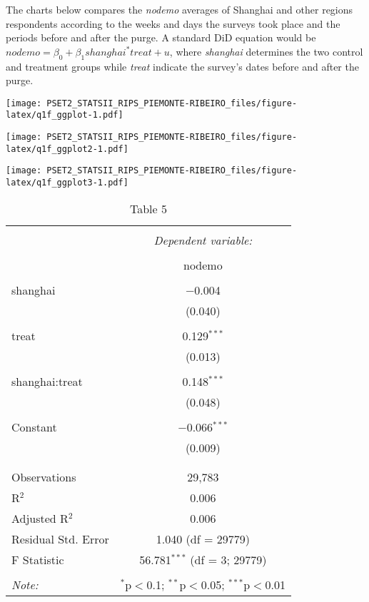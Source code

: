 \documentclass[
]{article}
\begin{document}
The charts below compares the \emph{nodemo} averages of Shanghai and
other regions respondents according to the weeks and days the surveys
took place and the periods before and after the purge. A standard DiD
equation would be \(nodemo = \beta_0 +\beta_1shanghai^*treat +u\), where
\emph{shanghai} determines the two control and treatment groups while
\emph{treat} indicate the survey's dates before and after the purge.

\texttt{[image: PSET2\_STATSII\_RIPS\_PIEMONTE-RIBEIRO\_files/figure-latex/q1f\_ggplot-1.pdf]}

\texttt{[image: PSET2\_STATSII\_RIPS\_PIEMONTE-RIBEIRO\_files/figure-latex/q1f\_ggplot2-1.pdf]}

\texttt{[image: PSET2\_STATSII\_RIPS\_PIEMONTE-RIBEIRO\_files/figure-latex/q1f\_ggplot3-1.pdf]}

\begin{table}[!htbp] \centering 
  \caption{Table 5} 
  \label{} 
\begin{tabular}{@{\extracolsep{5pt}}lc} 
\\[-1.8ex]\hline 
\hline \\[-1.8ex] 
 & \multicolumn{1}{c}{\textit{Dependent variable:}} \\ 
\cline{2-2} 
\\[-1.8ex] & nodemo \\ 
\hline \\[-1.8ex] 
 shanghai & $-$0.004 \\ 
  & (0.040) \\ 
  & \\ 
 treat & 0.129$^{***}$ \\ 
  & (0.013) \\ 
  & \\ 
 shanghai:treat & 0.148$^{***}$ \\ 
  & (0.048) \\ 
  & \\ 
 Constant & $-$0.066$^{***}$ \\ 
  & (0.009) \\ 
  & \\ 
\hline \\[-1.8ex] 
Observations & 29,783 \\ 
R$^{2}$ & 0.006 \\ 
Adjusted R$^{2}$ & 0.006 \\ 
Residual Std. Error & 1.040 (df = 29779) \\ 
F Statistic & 56.781$^{***}$ (df = 3; 29779) \\ 
\hline 
\hline \\[-1.8ex] 
\textit{Note:}  & \multicolumn{1}{r}{$^{*}$p$<$0.1; $^{**}$p$<$0.05; $^{***}$p$<$0.01} \\ 
\end{tabular} 
\end{table}
\end{document}

